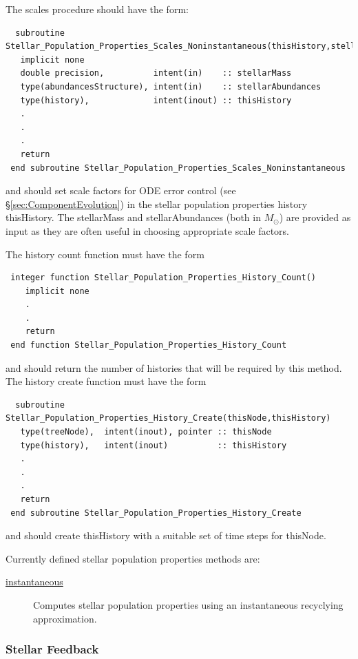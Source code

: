 The scales procedure should have the form:
\begin{verbatim}
  subroutine Stellar_Population_Properties_Scales_Noninstantaneous(thisHistory,stellarMass,stellarAbundances)
   implicit none
   double precision,          intent(in)    :: stellarMass
   type(abundancesStructure), intent(in)    :: stellarAbundances
   type(history),             intent(inout) :: thisHistory
   .
   .
   .
   return
 end subroutine Stellar_Population_Properties_Scales_Noninstantaneous
\end{verbatim}
and should set scale factors for ODE error control (see \S\ref{sec:ComponentEvolution}) in the stellar population properties history {\normalfont \ttfamily thisHistory}. The {\normalfont \ttfamily stellarMass} and {\normalfont \ttfamily stellarAbundances} (both in $M_\odot$) are provided as input as they are often useful in choosing appropriate scale factors.

The history count function must have the form
\begin{verbatim}
 integer function Stellar_Population_Properties_History_Count()
    implicit none
    .
    .
    return
 end function Stellar_Population_Properties_History_Count
\end{verbatim}
and should return the number of histories that will be required by this method. The history create function must have the form
\begin{verbatim}
  subroutine Stellar_Population_Properties_History_Create(thisNode,thisHistory)
   type(treeNode),  intent(inout), pointer :: thisNode
   type(history),   intent(inout)          :: thisHistory
   .
   .
   .
   return
 end subroutine Stellar_Population_Properties_History_Create
\end{verbatim}
and should create {\normalfont \ttfamily thisHistory} with a suitable set of time steps for {\normalfont \ttfamily thisNode}.

Currently defined stellar population properties methods are:
\begin{description}
 \item [\hyperlink{stellar_populations.properties.instantaneous.F90:stellar_population_properties_instantaneous:stellar_population_properties_rates_instantaneous}{{\normalfont \ttfamily instantaneous}}] Computes stellar population properties using an instantaneous recyclying approximation.
\end{description}

\subsubsection{Stellar Feedback}

